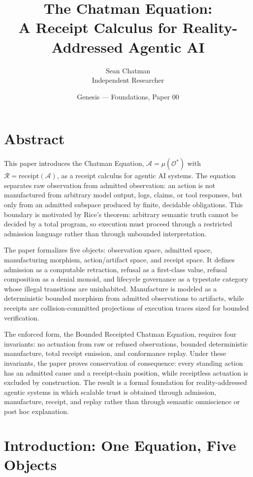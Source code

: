 \documentclass[11pt,oneside]{book}
\title{\bfseries The Chatman Equation:\\[0.4em]
\large A Receipt Calculus for Reality-Addressed Agentic AI}
\author{Sean Chatman \\ Independent Researcher}
\date{Genesis --- Foundations, Paper 00}
\theoremstyle{definition}
\theoremstyle{plain}
\theoremstyle{remark}
\begin{document}
\frontmatter
\maketitle

\chapter*{Abstract}

This paper introduces the Chatman Equation, $\mathcal{A} = \mu(\mathcal{O}^*)$ with $\mathcal{R} = \text{receipt}(\mathcal{A})$, as a receipt calculus for agentic AI systems. The equation separates raw observation from admitted observation: an action is not manufactured from arbitrary model output, logs, claims, or tool responses, but only from an admitted subspace produced by finite, decidable obligations. This boundary is motivated by Rice's theorem: arbitrary semantic truth cannot be decided by a total program, so execution must proceed through a restricted admission language rather than through unbounded interpretation.

The paper formalizes five objects: observation space, admitted space, manufacturing morphism, action/artifact space, and receipt space. It defines admission as a computable retraction, refusal as a first-class value, refusal composition as a denial monoid, and lifecycle governance as a typestate category whose illegal transitions are uninhabited. Manufacture is modeled as a deterministic bounded morphism from admitted observations to artifacts, while receipts are collision-committed projections of execution traces sized for bounded verification.

The enforced form, the Bounded Receipted Chatman Equation, requires four invariants: no actuation from raw or refused observations, bounded deterministic manufacture, total receipt emission, and conformance replay. Under these invariants, the paper proves conservation of consequence: every standing action has an admitted cause and a receipt-chain position, while receiptless actuation is excluded by construction. The result is a formal foundation for reality-addressed agentic systems in which scalable trust is obtained through admission, manufacture, receipt, and replay rather than through semantic omniscience or post hoc explanation.

\tableofcontents

\mainmatter

\chapter{Introduction: One Equation, Five Objects}
\label{ch:intro}
\end{document}
